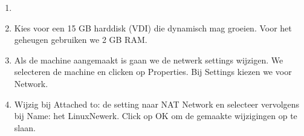 \begin{enumerate}
	\item 
		\begin{minipage}[t]{\linewidth}
		\raggedright
		\end{minipage}
	\item Kies voor een 15 GB harddisk (VDI) die dynamisch mag groeien. Voor het geheugen gebruiken we 2 GB RAM.

	\item Als de machine aangemaakt is gaan we de netwerk settings wijzigen. We selecteren de machine en clicken op Properties. Bij Settings kiezen we voor Network.
	\item
		\begin{minipage}[t]{\linewidth}
		\raggedright
		Wijzig bij Attached to: de setting naar NAT Network en selecteer vervolgens bij Name: het LinuxNewerk. Click op OK om de gemaakte wijzigingen op te slaan.
		\end{minipage}

\end{enumerate}
